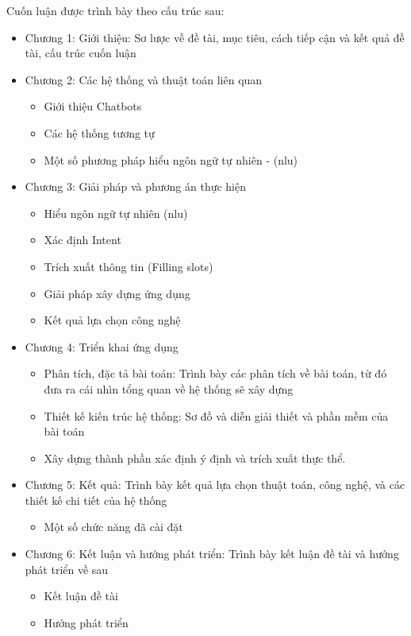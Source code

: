Cuốn luận được trình bày theo cấu trúc sau:
\begin{itemize}
    \item Chương 1: Giới thiệu: Sơ lược về đề tài, mục tiêu, cách tiếp cận và kết quả đề tài, cấu trúc cuốn luận
    \item Chương 2: Các hệ thống và thuật toán liên quan
          \begin{itemize}
              \item Giới thiệu Chatbots
              \item Các hệ thống tương tự
              \item Một số phương pháp hiểu ngôn ngữ tự nhiên - (\ac{nlu})
          \end{itemize}
    \item Chương 3: Giải pháp và phương án thực hiện
          \begin{itemize}
              \item Hiểu ngôn ngữ tự nhiên (\ac{nlu})
              \item Xác định Intent
              \item Trích xuất thông tin (Filling slots)
              \item Giải pháp xây dựng ứng dụng
              \item Kết quả lựa chọn công nghệ
          \end{itemize}
    \item Chương 4: Triển khai ứng dụng
          \begin{itemize}
              \item Phân tích, đặc tả bài toán: Trình bày các phân tích về bài toán, từ đó đưa ra cái nhìn tổng quan về hệ thống sẽ xây dựng
              \item Thiết kế kiến trúc hệ thống: Sơ đồ và diễn giải thiết và phần mềm của bài toán
              \item Xây dựng thành phần xác định ý định và trích xuất thực thể.
          \end{itemize}
    \item Chương 5: Kết quả: Trình bày kết quả lựa chọn thuật toán, công nghệ, và các thiết kế chi tiết của hệ thống
          \begin{itemize}
              \item Một số chức năng đã cài đặt
          \end{itemize}
    \item Chương 6: Kết luận và hướng phát triển: Trình bày kết luận đề tài và hướng phát triển về sau
          \begin{itemize}
              \item Kết luận đề tài
              \item Hướng phát triển
          \end{itemize}
\end{itemize}